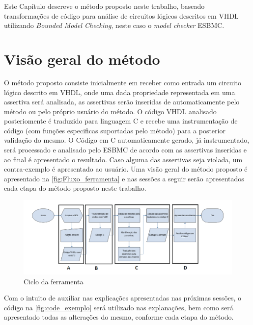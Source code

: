\label{chapter:metodo}

Este Capítulo descreve o método proposto neste trabalho, baseado transformações de código para análise de circuitos lógicos descritos em VHDL utilizando 
\textit{Bounded Model Checking}, neste caso o \textit{model checker} ESBMC.

\section{Visão geral do método}

O método proposto 
consiste inicialmente em receber como entrada um circuito lógico descrito em VHDL, onde uma dada propriedade representada em uma assertiva será analisada, as assertivas serão inseridas de automaticamente pelo método ou pelo próprio usuário do método. O código VHDL analisado posteriomente é traduzido para linguagem C e recebe uma instrumentação de código (com funções especificas suportadas pelo método) para a posterior validação do mesmo. O Código em C automaticamente gerado, já instrumentado, será processado e analisado pelo ESBMC de acordo com as assertivas inseridas e ao final é apresentado o resultado. Caso alguma das assertivas seja violada, um contra-exemplo é apresentado ao usuário. Uma visão geral do método proposto é apresentado na \autoref{fig:Fluxo_ferramenta} e nas sessões a seguir serão apresentados cada etapa do método proposto neste trabalho.

\begin{figure}[H]
	\begin{center}
    \caption{\label{fig:Fluxo_ferramenta}Ciclo da ferramenta}
	\includegraphics[scale=0.55]{Figuras/Fluxo_ferramenta.png}
	\end{center}
\end{figure}


Com o intuito de auxiliar nas explicações apresentadas nas próximas sessões, o código na \autoref{fig:code_exemplo} será utilizado nas explanações, bem como será apresentado todas as alterações do mesmo, conforme cada etapa do método.

